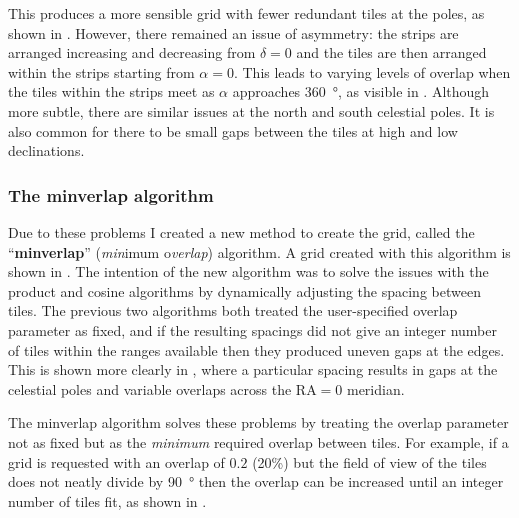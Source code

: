 \begin{colsection}
\begin{colsection}
This produces a more sensible grid with fewer redundant tiles at the poles, as shown in . However, there remained an issue of asymmetry: the strips are arranged increasing and decreasing from $\delta=0$ and the tiles are then arranged within the strips starting from $\alpha=0$. This leads to varying levels of overlap when the tiles within the strips meet as $\alpha$ approaches \SI{360}{\degree}, as visible in . Although more subtle, there are similar issues at the north and south celestial poles. It is also common for there to be small gaps between the tiles at high and low declinations.

\subsubsection{The minverlap algorithm}

Due to these problems I created a new method to create the grid, called the ``\textbf{minverlap}'' (\emph{min}imum o\emph{verlap}) algorithm. A grid created with this algorithm is shown in . The intention of the new algorithm was to solve the issues with the product and cosine algorithms by dynamically adjusting the spacing between tiles. The previous two algorithms both treated the user-specified overlap parameter as fixed, and if the resulting spacings did not give an integer number of tiles within the ranges available then they produced uneven gaps at the edges. This is shown more clearly in , where a particular spacing results in gaps at the celestial poles and variable overlaps across the RA$=0$ meridian.

The minverlap algorithm solves these problems by treating the overlap parameter not as fixed but as the \textit{minimum} required overlap between tiles. For example, if a grid is requested with an overlap of $0.2$ (20\%) but the field of view of the tiles does not neatly divide by \SI{90}{\degree} then the overlap can be increased until an integer number of tiles fit, as shown in .

\newpage


\end{colsection}
\end{colsection}
